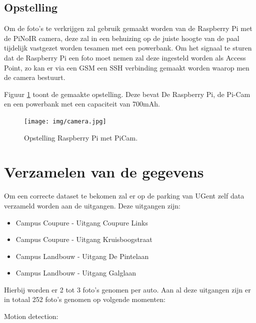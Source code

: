 \subsection{Opstelling}
Om de foto's te verkrijgen zal gebruik gemaakt worden van de Raspberry Pi met de PiNoIR camera, deze zal in een behuizing op de juiste hoogte van de paal tijdelijk vastgezet worden tesamen met een powerbank. Om het signaal te sturen dat de Raspberry Pi een foto moet nemen zal deze ingesteld worden als Access Point, zo kan er via een GSM een SSH verbinding gemaakt worden waarop men de camera bestuurt.

Figuur \ref{Opstelling} toont de gemaakte opstelling. Deze bevat De Raspberry Pi, de Pi-Cam en een powerbank met een capaciteit van 700mAh.
\begin{figure}[h]
	\centering
	\texttt{[image: img/camera.jpg]}
	\caption{Opstelling Raspberry Pi met PiCam.}
	\label{Opstelling}
\end{figure}

\section{Verzamelen van de gegevens}

Om een correcte dataset te bekomen zal er op de parking van UGent zelf data verzameld worden aan de uitgangen.
Deze uitgangen zijn:
\begin{itemize}
	\item Campus Coupure - Uitgang Coupure Links
	\item Campus Coupure - Uitgang Kruisboogstraat
	\item Campus Landbouw - Uitgang De Pintelaan
	\item Campus Landbouw - Uitgang Galglaan
\end{itemize}

Hierbij worden er 2 tot 3 foto's genomen per auto.
Aan al deze uitgangen zijn er in totaal 252 foto's genomen op volgende momenten:

Motion detection:


